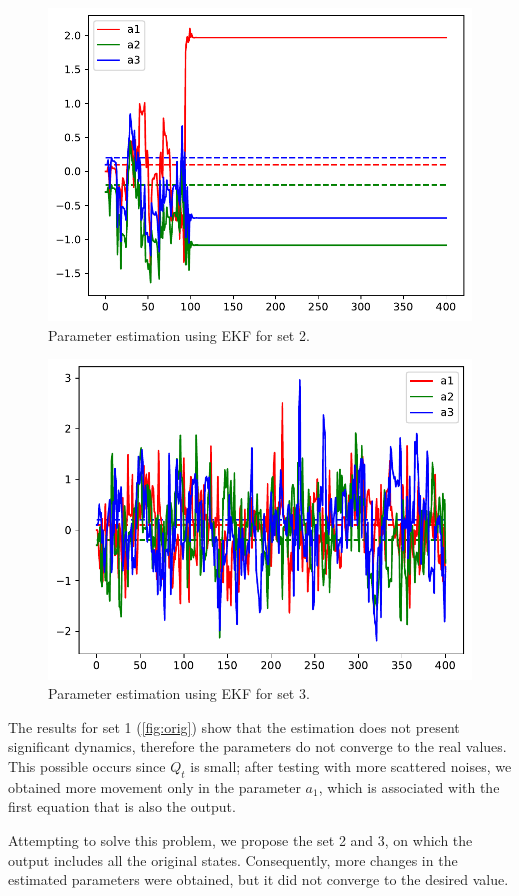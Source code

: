 \begin{figure}
  \centering
  \includegraphics[scale=.4]{files/chinese_estimation.pdf}
  \caption{Parameter estimation using EKF for set 2.}
  \label{fig:estimation}
\end{figure}

\begin{figure}
  \centering
  \includegraphics[scale=.4]{files/chinese_estimation_2.pdf}
  \caption{Parameter estimation using EKF for set 3.}
  \label{fig:estimation2}
\end{figure}

The results for set 1 (\cref{fig:orig}) show that the estimation does not present significant dynamics, therefore the parameters do not converge to the real values. This possible occurs since $Q_t$ is small; after testing with more scattered noises, we obtained more movement only in the parameter $a_1$, which is associated with the first equation that is also the output.


Attempting to solve this problem, we propose the set 2 and 3, on which the output includes all the original states. Consequently, more changes in the estimated parameters were obtained, but it did not converge to the desired value.
